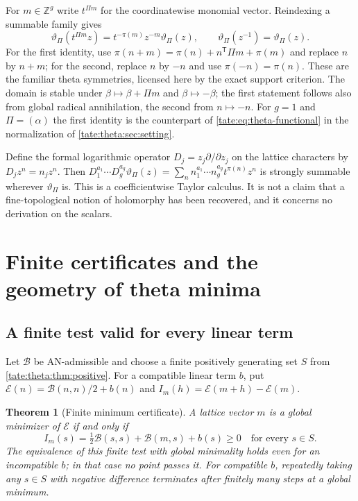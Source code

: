 \documentclass[11pt,letterpaper]{article}
\newtheorem{theorem}{Theorem}[section]
\theoremstyle{definition}
\newcommand{\Z}{\mathbb Z}
\newcommand{\cB}{\mathcal B}
\newcommand{\cE}{\mathcal E}
\begin{document}
For $m\in\Z^g$ write $t^{\Pi m}$ for the coordinatewise monomial vector.
Reindexing a summable family gives
\begin{equation}
 \vartheta_\Pi(t^{\Pi m}z)=t^{-\pi(m)}z^{-m}\vartheta_\Pi(z),
 \qquad \vartheta_\Pi(z^{-1})=\vartheta_\Pi(z).\label{tate:theta:eq:quasiperiod}
\end{equation}
For the first identity, use
$\pi(n+m)=\pi(n)+n^{\mathsf T}\Pi m+\pi(m)$ and replace $n$ by $n+m$;
for the second, replace $n$ by $-n$ and use $\pi(-n)=\pi(n)$.
These are the familiar theta symmetries, licensed here by the exact
support criterion. The domain is stable under
$\beta\mapsto\beta+\Pi m$ and $\beta\mapsto-\beta$; the first statement
follows also from global radical annihilation, the second from
$n\mapsto-n$. For $g=1$ and $\Pi=(\alpha)$ the first identity is the
counterpart of \eqref{tate:eq:theta-functional} in the normalization of
\cref{tate:theta:sec:setting}.

Define the formal logarithmic operator $D_j=z_j\partial/\partial z_j$ on
the lattice characters by $D_jz^n=n_jz^n$. Then
$D_1^{a_1}\cdots D_g^{a_g}\vartheta_\Pi(z)
=\sum_nn_1^{a_1}\cdots n_g^{a_g}t^{\pi(n)}z^n$ is strongly summable
wherever $\vartheta_\Pi$ is. This is a coefficientwise Taylor calculus. It
is not a claim that a fine-topological notion of holomorphy has been
recovered, and it concerns no derivation on the scalars.

\section{Finite certificates and the geometry of theta minima}\label{tate:theta:sec:certificates}

\subsection{A finite test valid for every linear term}

Let $\cB$ be AN-admissible and choose a finite positively generating set
$S$ from \cref{tate:theta:thm:positive}. For a compatible linear term $b$,
put $\cE(n)=\cB(n,n)/2+b(n)$ and $I_m(h)=\cE(m+h)-\cE(m)$.

\begin{theorem}[Finite minimum certificate]\label{tate:theta:thm:certificate}
A lattice vector $m$ is a global minimizer of $\cE$ if and only if
\begin{equation}
 I_m(s)=\tfrac12\cB(s,s)+\cB(m,s)+b(s)\ge0
 \quad\text{for every }s\in S.\label{tate:theta:eq:cert}
\end{equation}
The equivalence of this finite test with global minimality holds even for
an incompatible $b$; in that case no point passes it. For compatible $b$,
repeatedly taking any $s\in S$ with negative difference terminates after
finitely many steps at a global minimum.
\end{theorem}
\end{document}
